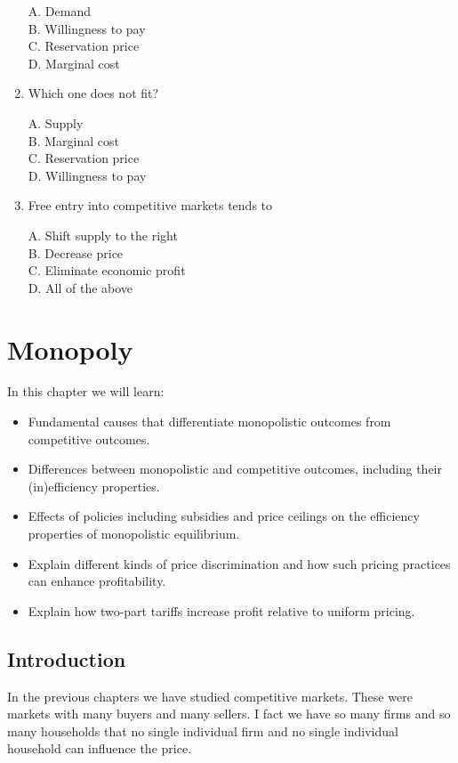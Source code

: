 \documentclass[
]{book}
\providecommand{\tightlist}{%
  \setlength{\itemsep}{0pt}\setlength{\parskip}{0pt}}
\begin{document}
\begin{enumerate}
  A. Demand\\
  B. Willingness to pay\\
  C. Reservation price\\
  D. Marginal cost
\item
  Which one does not fit?

  A. Supply\\
  B. Marginal cost\\
  C. Reservation price\\
  D. Willingness to pay
\item
  Free entry into competitive markets tends to

  A. Shift supply to the right\\
  B. Decrease price\\
  C. Eliminate economic profit\\
  D. All of the above
\end{enumerate}

\hypertarget{monopoly}{%
\chapter{Monopoly}\label{monopoly}}

In this chapter we will learn:

\begin{itemize}
\tightlist
\item
  Fundamental causes that differentiate monopolistic outcomes from competitive outcomes.
\item
  Differences between monopolistic and competitive outcomes, including their (in)efficiency properties.
\item
  Effects of policies including subsidies and price ceilings on the efficiency properties of monopolistic equilibrium.
\item
  Explain different kinds of price discrimination and how such pricing practices can enhance profitability.
\item
  Explain how two-part tariffs increase profit relative to uniform pricing.
\end{itemize}

\hypertarget{introduction}{%
\section{Introduction}\label{introduction}}

In the previous chapters we have studied competitive markets. These were markets with many buyers and many sellers. I fact we have so many firms and so many households that no single individual firm and no single individual household can influence the price.
\end{document}
